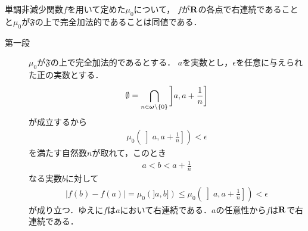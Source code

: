 	\begin{screen}
		\begin{thm}[右連続性と完全加法性]
			単調非減少関数$f$を用いて定めた$\mu_0$について，
			$f$が$\mathbf{R}$の各点で右連続であることと$\mu_0$が$\mathfrak{F}$の上で完全加法的であることは同値である．
		\end{thm}
	\end{screen}
	
	\begin{prf}\mbox{}
		\begin{description}
			\item[第一段]
				$\mu_0$が$\mathfrak{F}$の上で完全加法的であるとする．
				$a$を実数とし，$\epsilon$を任意に与えられた正の実数とする．
				\begin{align}
					\emptyset = \bigcap_{n \in {\boldsymbol \omega} \backslash \{0\}} \left]a,a + \frac{1}{n}\right] 
				\end{align}
				が成立するから
				\begin{align}
					\mu_0\left(\left]a,a + \frac{1}{n}\right]  \right) < \epsilon
				\end{align}
				を満たす自然数$n$が取れて，このとき
				\begin{align}
					a < b < a+\frac{1}{n}
				\end{align}
				なる実数$b$に対して
				\begin{align}
					|f(b) - f(a)| = \mu_0\left(]a,b]\right) \leq \mu_0\left(\left]a,a + \frac{1}{n}\right]  \right) < \epsilon
				\end{align}
				が成り立つ．ゆえに$f$は$a$において右連続である．$a$の任意性から$f$は$\mathbf{R}$で右連続である．
				

\end{description}
\end{prf}
